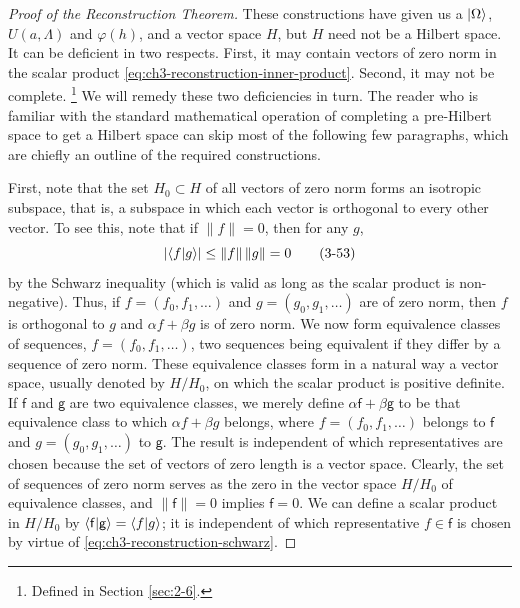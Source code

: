 \begin{proof}[Proof of the Reconstruction Theorem]
These constructions have given us a \(\lvert \Omega\rangle\), \(U(a,\Lambda)\) and
\(\varphi(h)\), and a vector space \(H\), but \(H\) need not be a Hilbert
space.  It can be deficient in two respects.  First, it may contain vectors
of zero norm in the scalar product \eqref{eq:ch3-reconstruction-inner-product}.  Second, it may not be
complete.%
\footnote{Defined in Section \ref{sec:2-6}.}
 We will remedy these two deficiencies in turn.  The reader who is familiar
with the standard mathematical operation of completing a pre-Hilbert space
to get a Hilbert space can skip most of the following few paragraphs, which
are chiefly an outline of the required constructions.

First, note that the set \(H_0\subset H\) of all vectors of zero norm forms
an isotropic subspace, that is, a subspace in which each vector is orthogonal
to every other vector.  To see this, note that if \(\lVert f\rVert=0\), then
for any \(g\),
\begin{equation}
\lvert\langle f\vert g\rangle\rvert\leq \lVert f\rVert\,\lVert g\rVert=0
\tag{3-53}\label{eq:ch3-reconstruction-schwarz}
\end{equation}
by the Schwarz inequality (which is valid as long as the scalar product is
non-negative).  Thus, if \(f=(f_0,f_1,\ldots)\) and
\(g=(g_0,g_1,\ldots)\) are of zero norm, then \(f\) is orthogonal to \(g\)
and \(\alpha f+\beta g\) is of zero norm.  We now form equivalence classes
of sequences, \(f=(f_0,f_1,\ldots)\), two sequences being equivalent if they
differ by a sequence of zero norm.  These equivalence classes form in a
natural way a vector space, usually denoted by \(H/H_0\), on which the scalar
product is positive definite.  If \(\mathsf f\) and \(\mathsf g\) are two
equivalence classes, we merely define \(\alpha\mathsf f+\beta\mathsf g\) to
be that equivalence class to which \(\alpha f+\beta g\) belongs, where
\(f=(f_0,f_1,\ldots)\) belongs to \(\mathsf f\) and
\(g=(g_0,g_1,\ldots)\) to \(\mathsf g\).  The result is independent of
which representatives are chosen because the set of vectors of zero length
is a vector space.  Clearly, the set of sequences of zero norm serves as the
zero in the vector space \(H/H_0\) of equivalence classes, and
\(\lVert\mathsf f\rVert=0\) implies \(\mathsf f=0\).  We can define a scalar
product in \(H/H_0\) by
\(\langle \mathsf f\vert \mathsf g\rangle=\langle f\vert g\rangle\); it is independent of which
representative \(f\in\mathsf f\) is chosen by virtue of \eqref{eq:ch3-reconstruction-schwarz}.


\end{proof}
